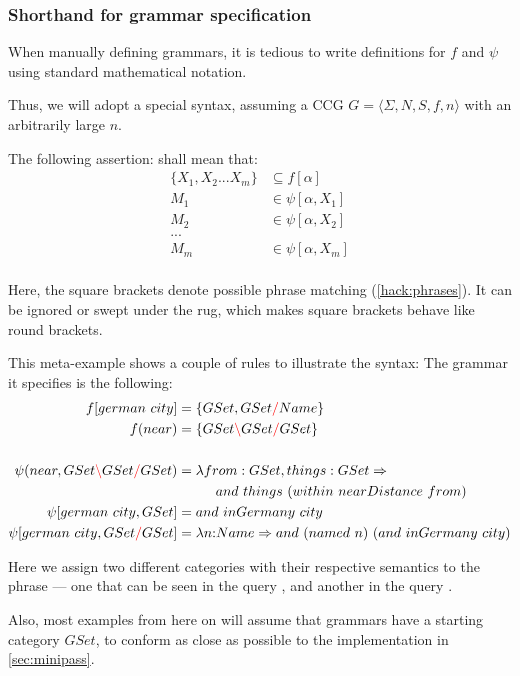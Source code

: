 \documentclass[main.tex]{subfiles}
\begin{document}
\subsubsection{Shorthand for grammar specification}
\label{shorthand}
When manually defining grammars, it is tedious to write definitions
for $f$ and $\psi$ using standard mathematical notation.

Thus, we will adopt a special syntax, assuming a CCG
$G = \langle \Sigma, N, S, f, n \rangle$ with an arbitrarily large $n$.

The following assertion:
shall mean that:
\begin{align*}
    \{ X_1, X_2 ... X_m \} & \subseteq f[\alpha] \\
    M_1 & \in \psi[\alpha, X_1] \\
    M_2 & \in \psi[\alpha, X_2] \\
    ... & \\
    M_m & \in \psi[\alpha, X_m] \\
\end{align*}

Here, the square brackets denote possible phrase matching (\cref{hack:phrases}). It can
be ignored or swept under the rug, which makes square brackets behave like
round brackets.

\begin{example}
    This meta-example shows a couple of rules to illustrate the syntax:
    The grammar it specifies is the following:
    \begin{align*}
        f[german \text{ } city] &= \{ GSet, GSet \textcolor{red}{/} Name \} \\
        f(near) &= \{ GSet \textcolor{red}{\backslash} GSet \textcolor{red}{/} GSet \} \\
        \\
        \psi(near, GSet \textcolor{red}{\backslash} GSet \textcolor{red}{/} GSet) &= \lambda from: GSet, things: GSet \Rightarrow \\
        & \phantom{=} \qquad and \text{ } things \text{ } (within \text{ } nearDistance \text{ } from) \\
        \psi[german \text{ } city, GSet] &= and \text{ } inGermany \text{ } city \\
        \psi[german \text{ } city, GSet \textcolor{red}{/} GSet] &= \lambda n{:} Name \Rightarrow and \text{ } (named \text{ } n) \text{ } (and \text{ } inGermany \text{ } city) \\
     \end{align*}

     Here we assign two different categories with their respective semantics
     to the phrase  --- one that can be seen in the query
     , and another in the query
     .
 \end{example}

Also, most examples from here on will assume that grammars have a starting
category $GSet$, to conform as close as possible to the implementation in
\cref{sec:minipass}.
\end{document}
